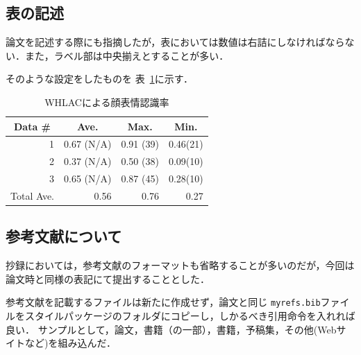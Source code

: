 \subsection{表の記述}
論文を記述する際にも指摘したが，表においては数値は右詰にしなければならない．また，ラベル部は中央揃えとすることが多い．

そのような設定をしたものを 表~\ref{table:face_rec}に示す．

\begin{table}[b]
\centering
\caption{WHLACによる顔表情認識率}
\label{table:face_rec}
\vspace{2mm}
\small
\begin{tabular}{|r|r|r|r|} \hline
\multicolumn{1}{|c|}{Data \#} & \multicolumn{1}{c|}{Ave.} & \multicolumn{1}{c|}{Max.} & \multicolumn{1}{c|}{Min.} \\ \hline\hline
1 &  0.67 (N/A) & 0.91 (39) & 0.46(21) \\ \hline
2 & 0.37 (N/A) & 0.50 (38) & 0.09(10) \\ \hline
3 & 0.65 (N/A) & 0.87 (45) & 0.28(10) \\ \hline\hline
\multicolumn{1}{|c|}{Total Ave.} & 0.56 & 0.76 & 0.27 \\ \hline
\end{tabular}
\end{table} %

\subsection{参考文献について}
抄録においては，参考文献のフォーマットも省略することが多いのだが，今回は論文時と同様の表記にて提出することとした．

参考文献を記載するファイルは新たに作成せず，論文と同じ \verb+myrefs.bib+ファイルをスタイルパッケージのフォルダにコピーし，しかるべき引用命令を入れれば良い．
サンプルとして，論文\cite{Kogami2009}，書籍（の一部）\cite{WelfareJapan}，書籍\cite{Nakata2010}，予稿集\cite{Miyaji2003ROMAN}，その他(Webサイトなど)\cite{HTUlatex}を組み込んだ．
